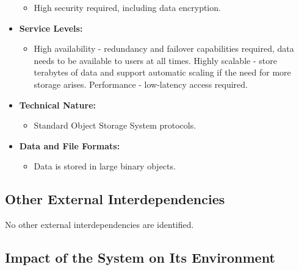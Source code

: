 \begin{itemize}
          \begin{itemize}
              \item High security required, including data encryption.
          \end{itemize}
    \item \textbf{Service Levels:}
          \begin{itemize}
              \item High availability - redundancy and failover capabilities required, data needs to be available to users at all times. Highly scalable - store terabytes of data and support automatic scaling if the need for more storage arises. Performance - low-latency access required.
          \end{itemize}
    \item \textbf{Technical Nature:}
          \begin{itemize}
              \item Standard Object Storage System protocols.
          \end{itemize}
    \item \textbf{Data and File Formats:}
          \begin{itemize}
              \item Data is stored in large binary objects.
          \end{itemize}
\end{itemize}


\subsection{Other External Interdependencies}

No other external interdependencies are identified.


\subsection{Impact of the System on Its Environment}

